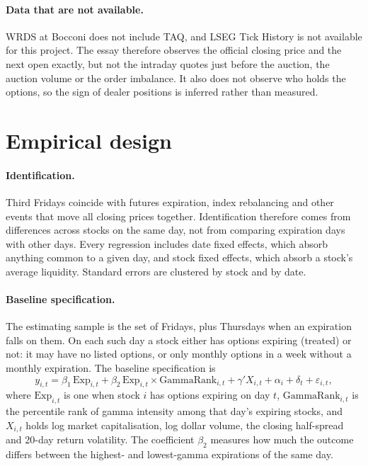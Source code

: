 \documentclass[11pt,a4paper]{article}
\begin{document}
\paragraph{Data that are not available.} WRDS at Bocconi does not include TAQ, and LSEG Tick History is not available for this project. The essay therefore observes the official closing price and the next open exactly, but not the intraday quotes just before the auction, the auction volume or the order imbalance. It also does not observe who holds the options, so the sign of dealer positions is inferred rather than measured.

\section{Empirical design}
\label{sec:design}

\paragraph{Identification.} Third Fridays coincide with futures expiration, index rebalancing and other events that move all closing prices together. Identification therefore comes from differences across stocks on the same day, not from comparing expiration days with other days. Every regression includes date fixed effects, which absorb anything common to a given day, and stock fixed effects, which absorb a stock's average liquidity. Standard errors are clustered by stock and by date.

\paragraph{Baseline specification.} The estimating sample is the set of Fridays, plus Thursdays when an expiration falls on them. On each such day a stock either has options expiring (treated) or not: it may have no listed options, or only monthly options in a week without a monthly expiration. The baseline specification is
\begin{equation}
y_{i,t} = \beta_1\,\mathrm{Exp}_{i,t} + \beta_2\,\mathrm{Exp}_{i,t}\times \mathrm{GammaRank}_{i,t} + \gamma' X_{i,t} + \alpha_i + \delta_t + \varepsilon_{i,t},
\end{equation}
where $\mathrm{Exp}_{i,t}$ is one when stock $i$ has options expiring on day $t$, $\mathrm{GammaRank}_{i,t}$ is the percentile rank of gamma intensity among that day's expiring stocks, and $X_{i,t}$ holds log market capitalisation, log dollar volume, the closing half-spread and 20-day return volatility. The coefficient $\beta_2$ measures how much the outcome differs between the highest- and lowest-gamma expirations of the same day.
\end{document}
